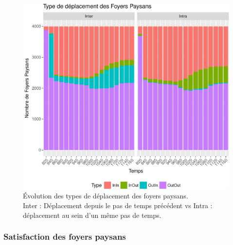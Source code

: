 \begin{figure}[H]
\captionsetup{width=\linewidth}
\includegraphics[width=\linewidth]{img/resultats/v0_types_deplacements.pdf}
\caption{Évolution des types de déplacement des foyers paysans.\\
Inter : Déplacement depuis le pas de temps précédent vs Intra :
déplacement au sein d'un même pas de temps.
\\
}
\label{fig:type-deplacements-v0}
\end{figure}

\clearpage

\subsubsection{Satisfaction des foyers paysans}

